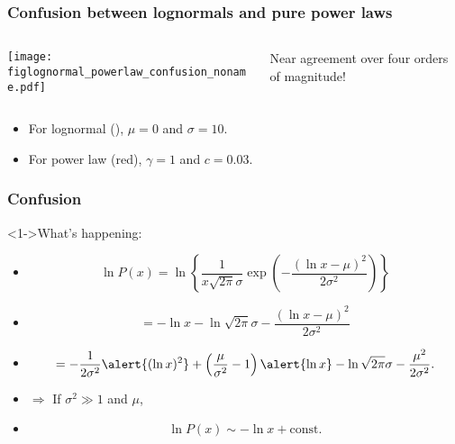 \begin{frame}
  \frametitle{Confusion between lognormals and pure power laws}

  \begin{columns}
    \begin{column}{0.6\textwidth}
      \texttt{[image: figlognormal\_powerlaw\_confusion\_noname.pdf]}    
    \end{column}
    \begin{column}{0.3\textwidth}
      Near agreement over four orders of magnitude!
    \end{column}
  \end{columns}

  \begin{itemize}
  \item For lognormal (), $\mu=0$ and $\sigma=10$.
  \item For power law (\alert{red}), $\gamma=1$ and $c=0.03$.
  \end{itemize}

\end{frame}

\begin{frame}
  \frametitle{Confusion}

  \begin{block}<1->{What's happening:}
    \begin{itemize}
    \item <2->  $$
      \ln P(x) = 
      \ln 
      \left\{ 
        \frac{1}{x \sqrt{2\pi} \sigma}
        \exp 
        \left(
          -\frac{(\ln x-\mu)^2}
          {2\sigma^2}
        \right)
      \right\}
      $$
    \item<3->    $$
      = -\ln x  
      -\ln \sqrt{2\pi} \sigma
      -\frac{(\ln x-\mu)^2}
      {2\sigma^2}
      $$
    \item<4->   $$
      = 
      -\frac{1}
      {2\sigma^2}
      \alert{  (\ln x)^2}
      + \left(
        \frac{\mu}{\sigma^2} - 1
      \right)
      \alert{\ln x  }
      -\ln \sqrt{2\pi} \sigma
      -\frac{\mu^2}
      {2\sigma^2}.
      $$
    \item<5-> $\Rightarrow$ If $\sigma^2 \gg 1$ and $\mu$,
    \item<6-> $$
      \boxed{\ln P(x) \sim - \ln {x} + \mbox{const.} }
      $$

    \end{itemize}
  \end{block}

\end{frame}

